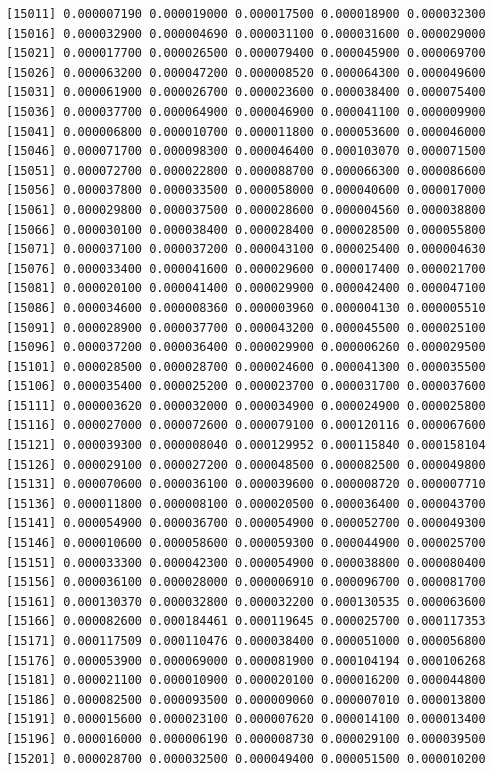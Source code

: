 \documentclass[]{article}
\begin{document}
\begin{verbatim}
[15011] 0.000007190 0.000019000 0.000017500 0.000018900 0.000032300
[15016] 0.000032900 0.000004690 0.000031100 0.000031600 0.000029000
[15021] 0.000017700 0.000026500 0.000079400 0.000045900 0.000069700
[15026] 0.000063200 0.000047200 0.000008520 0.000064300 0.000049600
[15031] 0.000061900 0.000026700 0.000023600 0.000038400 0.000075400
[15036] 0.000037700 0.000064900 0.000046900 0.000041100 0.000009900
[15041] 0.000006800 0.000010700 0.000011800 0.000053600 0.000046000
[15046] 0.000071700 0.000098300 0.000046400 0.000103070 0.000071500
[15051] 0.000072700 0.000022800 0.000088700 0.000066300 0.000086600
[15056] 0.000037800 0.000033500 0.000058000 0.000040600 0.000017000
[15061] 0.000029800 0.000037500 0.000028600 0.000004560 0.000038800
[15066] 0.000030100 0.000038400 0.000028400 0.000028500 0.000055800
[15071] 0.000037100 0.000037200 0.000043100 0.000025400 0.000004630
[15076] 0.000033400 0.000041600 0.000029600 0.000017400 0.000021700
[15081] 0.000020100 0.000041400 0.000029900 0.000042400 0.000047100
[15086] 0.000034600 0.000008360 0.000003960 0.000004130 0.000005510
[15091] 0.000028900 0.000037700 0.000043200 0.000045500 0.000025100
[15096] 0.000037200 0.000036400 0.000029900 0.000006260 0.000029500
[15101] 0.000028500 0.000028700 0.000024600 0.000041300 0.000035500
[15106] 0.000035400 0.000025200 0.000023700 0.000031700 0.000037600
[15111] 0.000003620 0.000032000 0.000034900 0.000024900 0.000025800
[15116] 0.000027000 0.000072600 0.000079100 0.000120116 0.000067600
[15121] 0.000039300 0.000008040 0.000129952 0.000115840 0.000158104
[15126] 0.000029100 0.000027200 0.000048500 0.000082500 0.000049800
[15131] 0.000070600 0.000036100 0.000039600 0.000008720 0.000007710
[15136] 0.000011800 0.000008100 0.000020500 0.000036400 0.000043700
[15141] 0.000054900 0.000036700 0.000054900 0.000052700 0.000049300
[15146] 0.000010600 0.000058600 0.000059300 0.000044900 0.000025700
[15151] 0.000033300 0.000042300 0.000054900 0.000038800 0.000080400
[15156] 0.000036100 0.000028000 0.000006910 0.000096700 0.000081700
[15161] 0.000130370 0.000032800 0.000032200 0.000130535 0.000063600
[15166] 0.000082600 0.000184461 0.000119645 0.000025700 0.000117353
[15171] 0.000117509 0.000110476 0.000038400 0.000051000 0.000056800
[15176] 0.000053900 0.000069000 0.000081900 0.000104194 0.000106268
[15181] 0.000021100 0.000010900 0.000020100 0.000016200 0.000044800
[15186] 0.000082500 0.000093500 0.000009060 0.000007010 0.000013800
[15191] 0.000015600 0.000023100 0.000007620 0.000014100 0.000013400
[15196] 0.000016000 0.000006190 0.000008730 0.000029100 0.000039500
[15201] 0.000028700 0.000032500 0.000049400 0.000051500 0.000010200

\end{verbatim}
\end{document}
